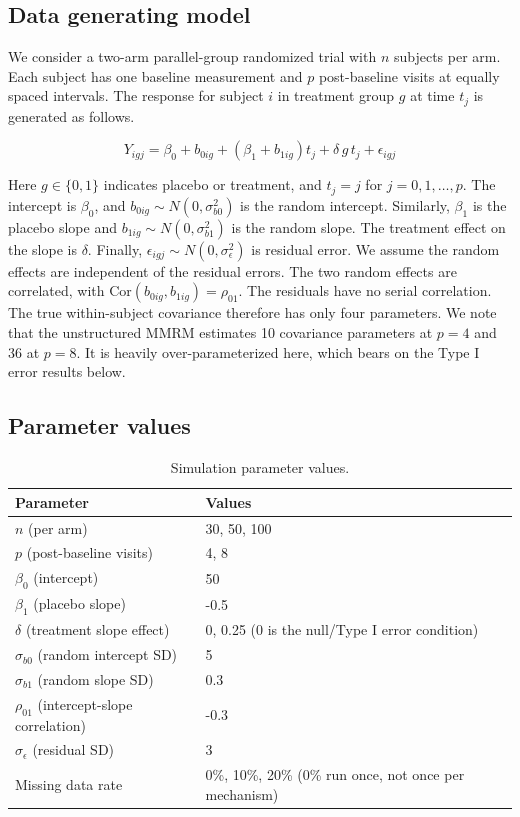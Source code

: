 \documentclass[
  11pt,
]{article}
\begin{document}
\subsection{Data generating model}\label{data-generating-model}

We consider a two-arm parallel-group randomized trial with \(n\)
subjects per arm. Each subject has one baseline measurement
and \(p\) post-baseline visits at equally spaced intervals. The
response
for subject \(i\) in treatment group \(g\) at time \(t_j\) is
generated as follows.

\[Y_{igj} = \beta_0 + b_{0ig} + (\beta_1 + b_{1ig}) t_j
  + \delta \, g \, t_j + \epsilon_{igj}\]

Here \(g \in \{0, 1\}\) indicates placebo or treatment, and
\(t_j = j\) for \(j = 0, 1, \dots, p\). The intercept is
\(\beta_0\), and \(b_{0ig} \sim N(0, \sigma^2_{b0})\) is the
random intercept. Similarly, \(\beta_1\) is the placebo slope
and \(b_{1ig} \sim N(0, \sigma^2_{b1})\) is the random slope.
The treatment effect on the slope is \(\delta\). Finally,
\(\epsilon_{igj} \sim N(0, \sigma^2_\epsilon)\) is residual
error. We assume the random effects are independent of the
residual errors. The two random effects are correlated, with
\(\text{Cor}(b_{0ig}, b_{1ig}) = \rho_{01}\). The residuals have
no serial correlation. The true within-subject covariance
therefore has only four parameters. We note that the
unstructured MMRM estimates 10 covariance parameters at
\(p = 4\) and 36 at \(p = 8\). It is heavily over-parameterized
here, which bears on the Type I error results below.

\subsection{Parameter values}\label{parameter-values}

\begin{table}[!h]
\centering
\caption{\label{tab:sim-params}Simulation parameter values.}
\centering
\fontsize{10}{12}\selectfont
\begin{tabular}[t]{ll}
\toprule
Parameter & Values\\
\midrule
$n$ (per arm) & 30, 50, 100\\
$p$ (post-baseline visits) & 4, 8\\
$\beta_0$ (intercept) & 50\\
$\beta_1$ (placebo slope) & -0.5\\
$\delta$ (treatment slope effect) & 0, 0.25 (0 is the null/Type I error condition)\\
\addlinespace
$\sigma_{b0}$ (random intercept SD) & 5\\
$\sigma_{b1}$ (random slope SD) & 0.3\\
$\rho_{01}$ (intercept-slope correlation) & -0.3\\
$\sigma_\epsilon$ (residual SD) & 3\\
Missing data rate & 0\%, 10\%, 20\% (0\% run once, not once per mechanism)\\
\bottomrule
\end{tabular}
\end{table}
\end{document}
